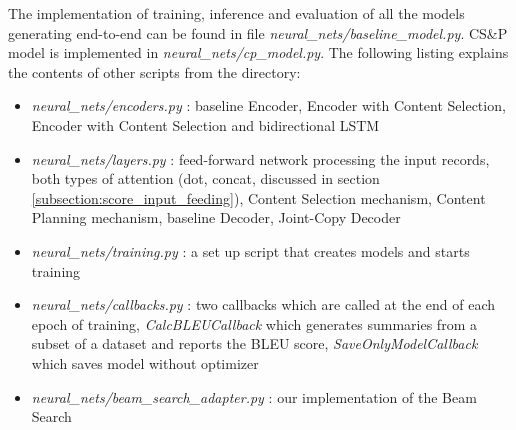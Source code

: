 The implementation of training, inference and evaluation of all the models generating end-to-end can be found in file \emph{neural\_nets/baseline\_model.py}. CS\&P model is implemented in \emph{neural\_nets/cp\_model.py}. The following listing explains the contents of other scripts from the directory:
\begin{itemize}
    \item \emph{neural\_nets/encoders.py} : baseline Encoder, Encoder with Content Selection, Encoder with Content Selection and bidirectional LSTM
    \item \emph{neural\_nets/layers.py} : feed-forward network processing the input records, both types of attention (dot, concat, discussed in section \ref{subsection:score_input_feeding}), Content Selection mechanism, Content Planning mechanism, baseline Decoder, Joint-Copy Decoder
    \item \emph{neural\_nets/training.py} : a set up script that creates models and starts training
    \item \emph{neural\_nets/callbacks.py} : two callbacks which are called at the end of each epoch of training, \emph{CalcBLEUCallback} which generates summaries from a subset of a dataset and reports the BLEU score, \emph{SaveOnlyModelCallback} which saves model without optimizer
    \item \emph{neural\_nets/beam\_search\_adapter.py} : our implementation of the Beam \linebreak Search
\end{itemize}